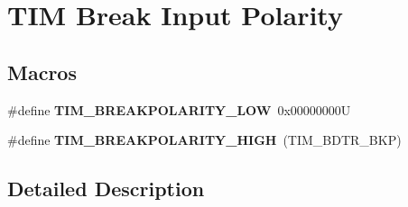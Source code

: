\hypertarget{group___t_i_m___break___polarity}{}\section{T\+IM Break Input Polarity}
\label{group___t_i_m___break___polarity}
\subsection*{Macros}
\begin{DoxyCompactItemize}
\item 
\mbox{\label{group___t_i_m___break___polarity_ga3e07cb0376c1bf561341dc8befb66208}} 
\#define {\bfseries T\+I\+M\+\_\+\+B\+R\+E\+A\+K\+P\+O\+L\+A\+R\+I\+T\+Y\+\_\+\+L\+OW}~0x00000000U
\item 
\mbox{\label{group___t_i_m___break___polarity_ga97c30f1134accd61e3e42ce37e472700}} 
\#define {\bfseries T\+I\+M\+\_\+\+B\+R\+E\+A\+K\+P\+O\+L\+A\+R\+I\+T\+Y\+\_\+\+H\+I\+GH}~(T\+I\+M\+\_\+\+B\+D\+T\+R\+\_\+\+B\+KP)
\end{DoxyCompactItemize}


\subsection{Detailed Description}
